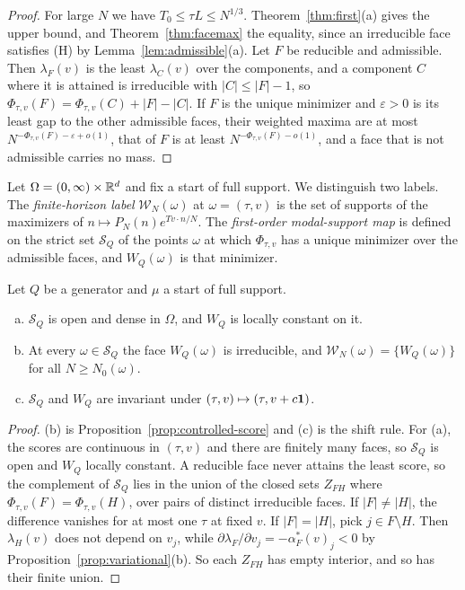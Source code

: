 \begin{proof}
For large $N$ we have $T_0\le\tau L\le N^{1/3}$. Theorem~\ref{thm:first}(a) gives the upper bound,
and Theorem~\ref{thm:facemax} the equality, since an irreducible face satisfies (H) by
Lemma~\ref{lem:admissible}(a). Let $F$ be reducible and admissible. Then $\lambda_F(v)$ is the
least $\lambda_C(v)$ over the components, and a component $C$ where it is attained is
irreducible with $|C|\le|F|-1$, so $\Phi_{\tau,v}(F)=\Phi_{\tau,v}(C)+|F|-|C|$. If $F$ is the unique
minimizer and $\varepsilon>0$ is its least gap to the other admissible faces, their weighted maxima
are at most $N^{-\Phi_{\tau,v}(F)-\varepsilon+o(1)}$, that of $F$ is at least
$N^{-\Phi_{\tau,v}(F)-o(1)}$, and a face that is not admissible carries no mass.
\end{proof}

Let $\Omega=(0,\infty)\times\mathbb{R}^d$ and fix a start of full support. We distinguish two labels.
The \emph{finite-horizon label} $\mathcal W_N(\omega)$ at $\omega=(\tau,v)$ is the set of supports
of the maximizers of $n\mapsto P_N(n)e^{Tv\cdot n/N}$. The \emph{first-order modal-support map}
is defined on the strict set $\mathcal S_Q$ of the points $\omega$ at which $\Phi_{\tau,v}$ has a
unique minimizer over the admissible faces, and $W_Q(\omega)$ is that minimizer.

\begin{lemma}\label{lem:strict}
Let $Q$ be a generator and $\mu$ a start of full support.
\begin{enumerate}[(a)]
\item $\mathcal S_Q$ is open and dense in $\Omega$, and $W_Q$ is locally constant on it.
\item At every $\omega\in\mathcal S_Q$ the face $W_Q(\omega)$ is irreducible, and
$\mathcal W_N(\omega)=\{W_Q(\omega)\}$ for all $N\ge N_0(\omega)$.
\item $\mathcal S_Q$ and $W_Q$ are invariant under $(\tau,v)\mapsto(\tau,v+c\mathbf{1})$.
\end{enumerate}
\end{lemma}

\begin{proof}
(b) is Proposition~\ref{prop:controlled-score} and (c) is the shift rule. For (a), the scores are
continuous in $(\tau,v)$ and there are finitely many faces, so $\mathcal S_Q$ is open and $W_Q$
locally constant. A reducible face never attains the least score, so the complement of
$\mathcal S_Q$ lies in the union of the closed sets $Z_{FH}$ where
$\Phi_{\tau,v}(F)=\Phi_{\tau,v}(H)$, over pairs of distinct irreducible faces. If $|F|\ne|H|$, the
difference vanishes for at most one $\tau$ at fixed $v$. If $|F|=|H|$, pick $j\in F\setminus H$.
Then $\lambda_H(v)$ does not depend on $v_j$, while
$\partial\lambda_F/\partial v_j=-\alpha^*_F(v)_j<0$ by Proposition~\ref{prop:variational}(b). So
each $Z_{FH}$ has empty interior, and so has their finite union.
\end{proof}

